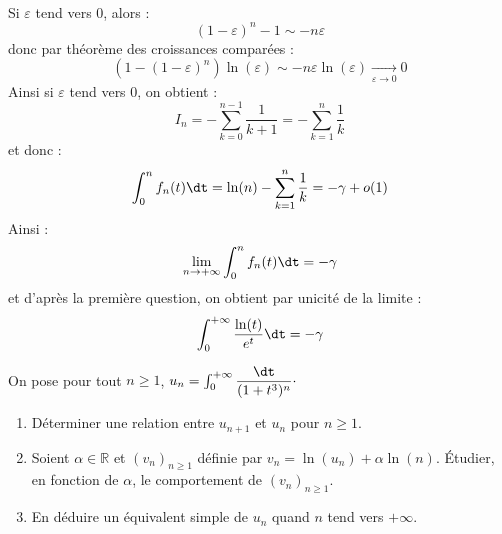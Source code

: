 \documentclass[a4paper,10pt]{report}
\begin{document}
\begin{enumerate}
\begin{align*}
 \end{align*}
 Si $\varepsilon$ tend vers $0$, alors :
 $$ (1- \varepsilon)^n -1 \sim -n \varepsilon$$
 donc par théorème des croissances comparées :
 $$ (1-(1- \varepsilon)^n)\ln(\varepsilon) \sim - n \varepsilon \ln(\varepsilon) \underset{\varepsilon \rightarrow 0}{\longrightarrow} 0$$
 Ainsi si $\varepsilon$ tend vers $0$, on obtient :
 $$ I_n = - \sum_{k=0}^{n-1} \dfrac{1}{k+1} = - \sum_{k=1}^n \dfrac{1}{k}$$
 et donc :
 $$ \int_{0}^n f_n(t) \dt = \ln(n)  - \sum_{k=1}^n \dfrac{1}{k} = -\gamma + o(1)$$
 Ainsi :
 $$ \lim_{n \rightarrow + \infty} \int_{0}^n f_n(t) \dt = - \gamma$$
 et d'après la première question, on obtient par unicité de la limite : 
 $$  \int_{0}^{+ \infty} \dfrac{\ln(t)}{e^t} \dt = - \gamma $$
\end{enumerate}

\begin{Exa} On pose pour tout $n \geq 1$, $u_n = \int_{0}^{+ \infty} \dfrac{\dt}{(1+t^3)^n} \cdot$
\begin{enumerate}
\item Déterminer une relation entre $u_{n+1}$ et $u_n$ pour $n \geq 1$.
\item Soient $\alpha \in \mathbb{R}$ et $(v_n)_{n \geq 1}$ définie par $v_n = \ln(u_n) + \alpha \ln(n)$. Étudier, en fonction de $\alpha$, le comportement de $(v_n)_{n \geq 1}$.
\item En déduire un équivalent simple de $u_n$ quand $n$ tend vers $+ \infty$.
\end{enumerate}
\end{Exa} 
\end{document}
